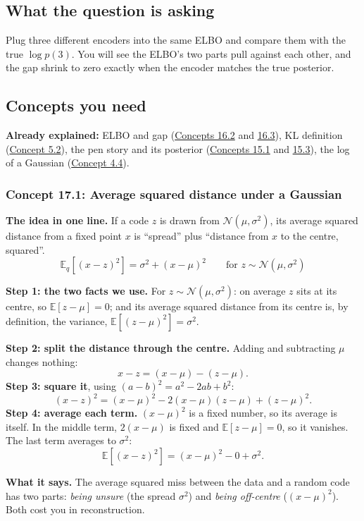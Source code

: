 \documentclass[12pt,a4paper]{article}
\begin{document}
\subsection{What the question is asking}

Plug three different encoders into the same ELBO and compare them with the true $\log p(3)$. You will see the ELBO's two parts pull against each other, and the gap shrink to zero exactly when the encoder matches the true posterior.

\subsection{Concepts you need}

\textbf{Already explained:} ELBO and gap (\hyperref[c16-2]{Concepts 16.2} and \hyperref[c16-3]{16.3}), KL definition (\hyperref[c5-2]{Concept 5.2}), the pen story and its posterior (\hyperref[c15-1]{Concepts 15.1} and \hyperref[c15-3]{15.3}), the log of a Gaussian (\hyperref[c4-4]{Concept 4.4}).

\subsubsection{Concept 17.1: Average squared distance under a Gaussian}\label{c17-1}

\textbf{The idea in one line.} If a code $z$ is drawn from $\mathcal{N}(\mu,\sigma^2)$, its average squared distance from a fixed point $x$ is ``spread'' plus ``distance from $x$ to the centre, squared''.
\[
\mathbb{E}_q[(x-z)^2]=\sigma^2+(x-\mu)^2\qquad\text{for }z\sim\mathcal{N}(\mu,\sigma^2)
\]

\textbf{Step 1: the two facts we use.} For $z\sim\mathcal{N}(\mu,\sigma^2)$: on average $z$ sits at its centre, so $\mathbb{E}[z-\mu]=0$; and its average squared distance from its centre is, by definition, the variance, $\mathbb{E}[(z-\mu)^2]=\sigma^2$.

\textbf{Step 2: split the distance through the centre.} Adding and subtracting $\mu$ changes nothing:
\[
x-z=(x-\mu)-(z-\mu).
\]
\textbf{Step 3: square it}, using $(a-b)^2=a^2-2ab+b^2$:
\[
(x-z)^2=(x-\mu)^2-2(x-\mu)(z-\mu)+(z-\mu)^2 .
\]
\textbf{Step 4: average each term.} $(x-\mu)^2$ is a fixed number, so its average is itself. In the middle term, $2(x-\mu)$ is fixed and $\mathbb{E}[z-\mu]=0$, so it vanishes. The last term averages to $\sigma^2$:
\[
\mathbb{E}[(x-z)^2]=(x-\mu)^2-0+\sigma^2 .
\]

\textbf{What it says.} The average squared miss between the data and a random code has two parts: \emph{being unsure} (the spread $\sigma^2$) and \emph{being off-centre} ($(x-\mu)^2$). Both cost you in reconstruction.
\end{document}
